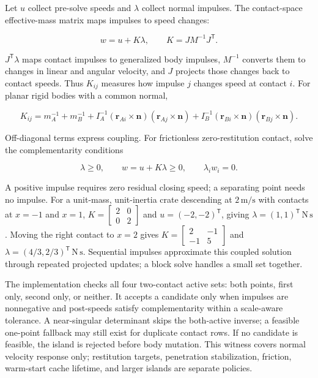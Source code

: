 Let \(u\) collect pre-solve speeds and \(\lambda\) collect normal impulses. The contact-space effective-mass matrix maps impulses to speed changes:

\[
w=u+K\lambda,\qquad K=JM^{-1}J^\mathsf T.
\]

\(J^\mathsf T\lambda\) maps contact impulses to generalized body impulses, \(M^{-1}\) converts them to changes in linear and angular velocity, and \(J\) projects those changes back to contact speeds. Thus \(K_{ij}\) measures how impulse \(j\) changes speed at contact \(i\). For planar rigid bodies with a common normal,

\[
K_{ij}=m_A^{-1}+m_B^{-1}+I_A^{-1}(\mathbf r_{Ai}\times\mathbf n)(\mathbf r_{Aj}\times\mathbf n)+I_B^{-1}(\mathbf r_{Bi}\times\mathbf n)(\mathbf r_{Bj}\times\mathbf n).
\]

Off-diagonal terms express coupling. For frictionless zero-restitution contact, solve the complementarity conditions

\[
\lambda\ge0,\qquad w=u+K\lambda\ge0,\qquad \lambda_iw_i=0.
\]

A positive impulse requires zero residual closing speed; a separating point needs no impulse. For a unit-mass, unit-inertia crate descending at \(2\,\mathrm{m/s}\) with contacts at \(x=-1\) and \(x=1\), \(K=\begin{bmatrix}2&0\\0&2\end{bmatrix}\) and \(u=(-2,-2)^\mathsf T\), giving \(\lambda=(1,1)^\mathsf T\,\mathrm{N\,s}\). Moving the right contact to \(x=2\) gives \(K=\begin{bmatrix}2&-1\\-1&5\end{bmatrix}\) and \(\lambda=(4/3,2/3)^\mathsf T\,\mathrm{N\,s}\). Sequential impulses approximate this coupled solution through repeated projected updates; a block solve handles a small set together.

The implementation checks all four two-contact active sets: both points, first only, second only, or neither. It accepts a candidate only when impulses are nonnegative and post-speeds satisfy complementarity within a scale-aware tolerance. A near-singular determinant skips the both-active inverse; a feasible one-point fallback may still exist for duplicate contact rows. If no candidate is feasible, the island is rejected before body mutation. This witness covers normal velocity response only; restitution targets, penetration stabilization, friction, warm-start cache lifetime, and larger islands are separate policies.

